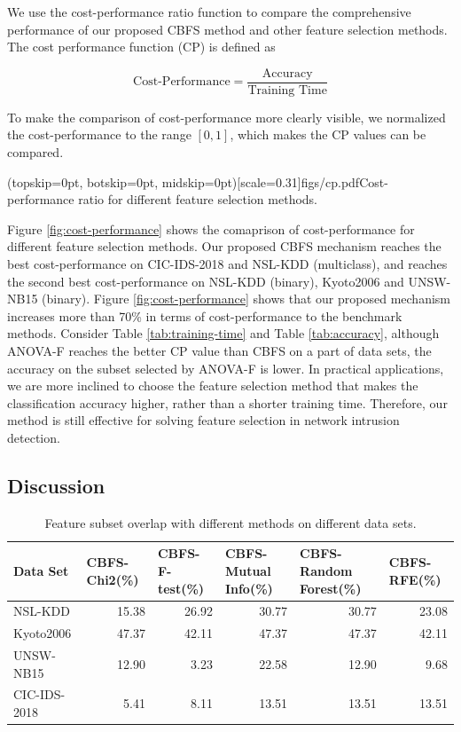 \documentclass{ieeeaccess}
\theoremstyle{definition}
\begin{document}
We use the cost-performance ratio function to compare the comprehensive performance of our proposed CBFS method and other feature selection methods. The cost performance function (CP) is defined as

\begin{equation}
    \text{Cost-Performance} = \frac{\text{Accuracy}}{\text{Training Time}}
\end{equation}

To make the comparison of cost-performance more clearly visible, we normalized the cost-performance to the range $[0, 1]$, which makes the CP values can be compared.

\Figure[!htpb](topskip=0pt, botskip=0pt, midskip=0pt)[scale=0.31]{figs/cp.pdf}{Cost-performance ratio for different feature selection methods. \label{fig:cost-performance}}

Figure \ref{fig:cost-performance} shows the comaprison of cost-performance for different feature selection methods. Our proposed CBFS mechanism reaches the best cost-performance on CIC-IDS-2018 and NSL-KDD (multiclass), and reaches the second best cost-performance on NSL-KDD (binary), Kyoto2006 and UNSW-NB15 (binary). 
Figure \ref{fig:cost-performance} shows that our proposed mechanism increases more than 70\% in terms of cost-performance to the benchmark methods.  
Consider Table \ref{tab:training-time} and Table \ref{tab:accuracy}, although ANOVA-F reaches the better CP value than CBFS on a part of data sets, the accuracy on the subset selected by ANOVA-F is lower. In practical applications, we are more inclined to choose the feature selection method that makes the classification accuracy higher, rather than a shorter training time. Therefore, our method is still effective for solving feature selection in network intrusion detection.

\subsection{Discussion}

\begin{table}[htbp]
    \centering
    \caption{Feature subset overlap with different methods on different data sets.}
    \begin{tabular}{lrrrrr}
    \toprule
    Data Set & \multicolumn{1}{l}{CBFS-Chi2(\%)} & \multicolumn{1}{l}{CBFS-F-test(\%)} & \multicolumn{1}{l}{CBFS-Mutual Info(\%)} & \multicolumn{1}{l}{CBFS-Random Forest(\%)} & \multicolumn{1}{l}{CBFS-RFE(\%)} \\
    \midrule
    NSL-KDD & 15.38  & 26.92  & 30.77  & 30.77  & 23.08  \\
    Kyoto2006 & 47.37  & 42.11  & 47.37  & 47.37  & 42.11  \\
    UNSW-NB15 & 12.90  & 3.23  & 22.58  & 12.90  & 9.68  \\
    CIC-IDS-2018 & 5.41  & 8.11  & 13.51  & 13.51  & 13.51  \\
    \bottomrule
    \end{tabular}%
    \label{tab:feature-overlap}%
\end{table}%
\end{document}
